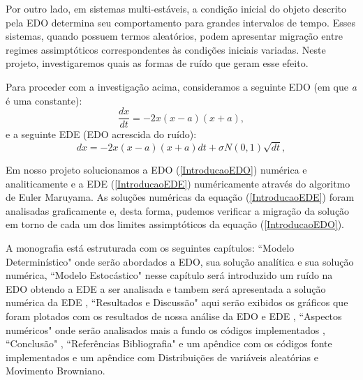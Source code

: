Por outro lado, em sistemas multi-estáveis, a condição inicial do objeto descrito pela EDO determina seu comportamento para grandes intervalos de tempo. Esses sistemas, quando possuem termos aleatórios, podem apresentar migração entre regimes assimptóticos correspondentes às condições iniciais variadas. Neste projeto, investigaremos quais as formas de ruído que geram esse efeito.

Para proceder com a investigação acima, consideramos a seguinte EDO (em que \textit{a} é uma constante):
\begin{equation} \label{IntroducaoEDO}
\frac{dx}{dt} = -2x(x-a)(x+a) ,
\end{equation}
e a seguinte EDE (EDO acrescida do ruído):
\begin{equation} \label{IntroducaoEDE}
{dx} = -2x(x-a)(x+a)dt + \sigma N(0,1) \sqrt{dt} ,
\end{equation}

Em nosso projeto solucionamos a EDO (\ref{IntroducaoEDO}) numérica e analiticamente e a EDE \newline
(\ref{IntroducaoEDE}) numéricamente através do algoritmo de Euler Maruyama. As soluções numéricas da equação (\ref{IntroducaoEDE}) foram analisadas graficamente e, desta forma, pudemos verificar a migração da solução em torno de cada um dos limites assimptóticos da equação (\ref{IntroducaoEDO}). 

A monografia está estruturada com os seguintes capítulos: ``Modelo Determinístico" onde serão abordados \newline
a EDO, sua solução analítica e sua solução numérica, ``Modelo Estocástico" nesse capítulo será introduzido um ruído na EDO obtendo a EDE a ser analisada e tambem será apresentada a solução numérica da EDE , ``Resultados e Discussão" aqui serão exibidos os gráficos que foram plotados com os resultados de nossa análise da EDO e EDE , ``Aspectos numéricos" onde serão analisados mais a fundo os códigos implementados , ``Conclusão" , ``Referências Bibliografia" e um apêndice com os códigos fonte implementados e um apêndice com Distribuições de variáveis aleatórias e Movimento Browniano.